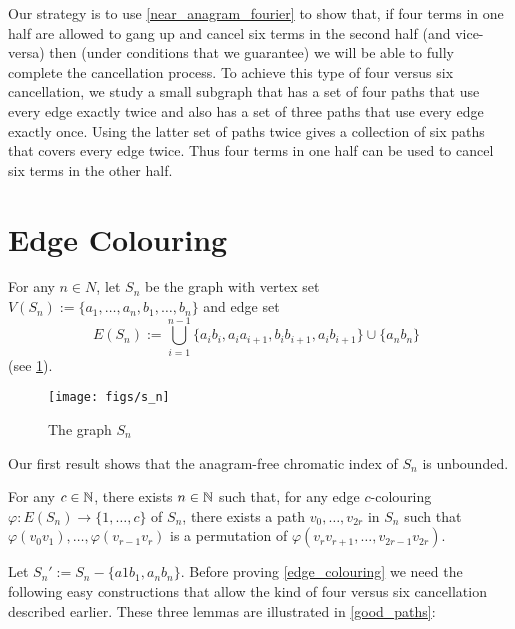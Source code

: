 \documentclass{patmorin}
\begin{document}
Our strategy is to use \cref{near_anagram_fourier} to show that, if four terms in one half are allowed to gang up and cancel six terms in the second half (and vice-versa) then (under conditions that we guarantee) we will be able to fully complete the cancellation process.  To achieve this type of four versus six cancellation, we study a small subgraph that has a set of four paths that use every edge exactly twice and also has a set of three paths that use every edge exactly once.  Using the latter set of paths twice gives a collection of six paths that covers every edge twice.  Thus four terms in one half can be used to cancel six terms in the other half.


\section{Edge Colouring}

For any $n\in N$, let $S_n$ be the graph with vertex set $V(S_n):=\{a_1,\ldots,a_n,b_1,\ldots,b_n\}$ and edge set
\[
    E(S_n) := \bigcup_{i=1}^{n-1} \{a_ib_i,a_ia_{i+1},b_ib_{i+1},a_ib_{i+1}\} \cup \{a_nb_n\} \enspace
\]
(see \cref{s_n}).

\begin{figure}
    \begin{center}
        \texttt{[image: figs/s\_n]}
    \end{center}
    \caption{The graph $S_n$}
    \label{s_n}
\end{figure}

Our first result shows that the anagram-free chromatic index of $S_n$ is unbounded.

\begin{thm}\label{edge_colouring}
    For any $c\in\mathbb{N}$, there exists $n\in\mathbb{N}$ such that, for any edge $c$-colouring $\varphi:E(S_n)\to\{1,\ldots,c\}$ of $S_n$, there exists a path $v_0,\ldots,v_{2r}$ in $S_n$ such that $\varphi(v_0v_1),\ldots,\varphi(v_{r-1}v_r)$ is a permutation of $\varphi(v_rv_{r+1},\ldots,v_{2r-1}v_{2r})$.
\end{thm}

Let $S_n':=S_n-\{a1b_1,a_nb_n\}$. Before proving \cref{edge_colouring} we need the following easy constructions that allow the kind of four versus six cancellation described earlier.  These three lemmas are illustrated in \cref{good_paths}:
\end{document}
